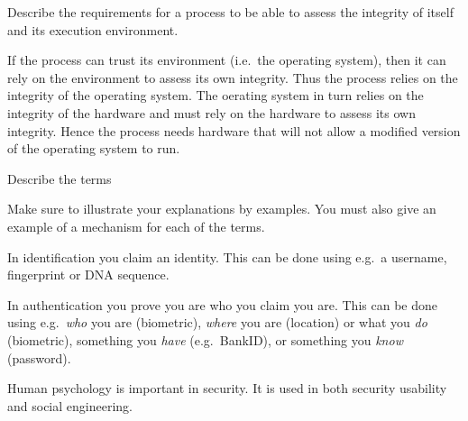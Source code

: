 \documentclass[svv,addpoints]{miunexam}
\begin{document}
\begin{questions}
  
\question[3]\label{q:trustcomp}
Describe the requirements for a process to be able to assess the integrity of 
itself and its execution environment.

\begin{solution}
  If the process can trust its environment (i.e.\ the operating system), then 
  it can rely on the environment to assess its own integrity.
  Thus the process relies on the integrity of the operating system.
  The oerating system in turn relies on the integrity of the hardware and must 
  rely on the hardware to assess its own integrity.
  Hence the process needs hardware that will not allow a modified version of 
  the operating system to run.
\end{solution}



\question\label{q:auth:E:C}
  Describe the terms
  Make sure to illustrate your explanations by examples.
  You must also give an example of a mechanism for each of the terms.

  \begin{solution}
    In identification you claim an identity.
    This can be done using e.g.~a username, fingerprint or DNA sequence.

    In authentication you prove you are who you claim you are.
    This can be done using e.g.~\emph{who} you are (biometric), \emph{where} 
    you are (location) or what you \emph{do} (biometric), something you 
    \emph{have} (e.g.~BankID), or something you \emph{know} (password).
  \end{solution}


  
\question\label{q:usability:E:C:A}
  Human psychology is important in security.
  It is used in both security usability and social engineering.
\end{questions}
\end{document}
